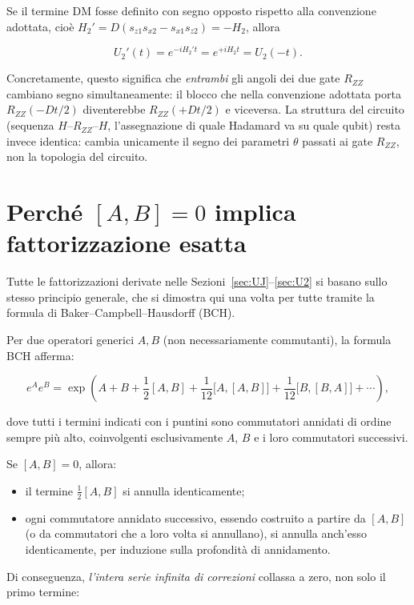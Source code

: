 \documentclass[11pt,a4paper]{article}
\begin{document}
Se il termine DM fosse definito con segno opposto rispetto alla convenzione adottata, cioè $H_2' = D(s_{z1}s_{x2}-s_{x1}s_{z2}) = -H_2$, allora

\begin{equation}
U_2'(t) = e^{-iH_2't} = e^{+iH_2t} = U_2(-t).
\end{equation}

Concretamente, questo significa che \emph{entrambi} gli angoli dei due gate $R_{ZZ}$ cambiano segno simultaneamente: il blocco che nella convenzione adottata porta $R_{ZZ}(-Dt/2)$ diventerebbe $R_{ZZ}(+Dt/2)$ e viceversa. La struttura del circuito (sequenza $H$--$R_{ZZ}$--$H$, l'assegnazione di quale Hadamard va su quale qubit) resta invece identica: cambia unicamente il segno dei parametri $\theta$ passati ai gate $R_{ZZ}$, non la topologia del circuito.

\section{Perché $[A,B]=0$ implica fattorizzazione esatta}
\label{sec:BCH}

Tutte le fattorizzazioni derivate nelle Sezioni~\ref{sec:UJ}--\ref{sec:U2} si basano sullo stesso principio generale, che si dimostra qui una volta per tutte tramite la formula di Baker--Campbell--Hausdorff (BCH).

Per due operatori generici $A,B$ (non necessariamente commutanti), la formula BCH afferma:

\begin{equation}
e^{A}e^{B} = \exp\left(A+B+\frac{1}{2}[A,B]+\frac{1}{12}\big[A,[A,B]\big]+\frac{1}{12}\big[B,[B,A]\big]+\cdots\right),
\end{equation}

dove tutti i termini indicati con i puntini sono commutatori annidati di ordine sempre più alto, coinvolgenti esclusivamente $A$, $B$ e i loro commutatori successivi.

Se $[A,B]=0$, allora:
\begin{itemize}
\item il termine $\frac12[A,B]$ si annulla identicamente;
\item ogni commutatore annidato successivo, essendo costruito a partire da $[A,B]$ (o da commutatori che a loro volta si annullano), si annulla anch'esso identicamente, per induzione sulla profondità di annidamento.
\end{itemize}

Di conseguenza, \emph{l'intera serie infinita di correzioni} collassa a zero, non solo il primo termine:
\end{document}
